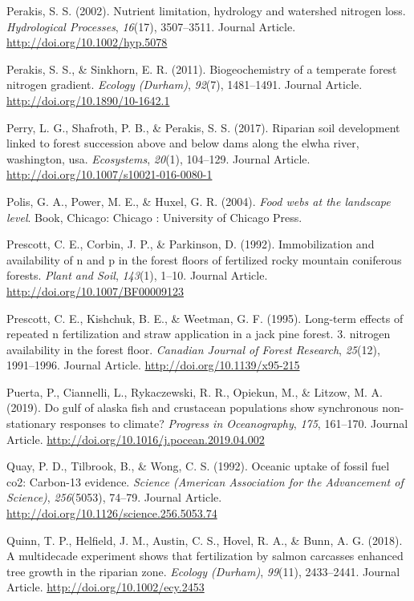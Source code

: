 \documentclass [11pt, proquest] {uwthesis}[2015/03/03]
\begin{document}
\hypertarget{ref-Perakis2002}{}
Perakis, S. S. (2002). Nutrient limitation, hydrology and watershed
nitrogen loss. \emph{Hydrological Processes}, \emph{16}(17), 3507--3511.
Journal Article. \url{http://doi.org/10.1002/hyp.5078}

\hypertarget{ref-Perakis2011}{}
Perakis, S. S., \& Sinkhorn, E. R. (2011). Biogeochemistry of a
temperate forest nitrogen gradient. \emph{Ecology (Durham)},
\emph{92}(7), 1481--1491. Journal Article.
\url{http://doi.org/10.1890/10-1642.1}

\hypertarget{ref-Perry2017}{}
Perry, L. G., Shafroth, P. B., \& Perakis, S. S. (2017). Riparian soil
development linked to forest succession above and below dams along the
elwha river, washington, usa. \emph{Ecosystems}, \emph{20}(1), 104--129.
Journal Article. \url{http://doi.org/10.1007/s10021-016-0080-1}

\hypertarget{ref-Polis2004}{}
Polis, G. A., Power, M. E., \& Huxel, G. R. (2004). \emph{Food webs at
the landscape level}. Book, Chicago: Chicago : University of Chicago
Press.

\hypertarget{ref-Prescott1992}{}
Prescott, C. E., Corbin, J. P., \& Parkinson, D. (1992). Immobilization
and availability of n and p in the forest floors of fertilized rocky
mountain coniferous forests. \emph{Plant and Soil}, \emph{143}(1),
1--10. Journal Article. \url{http://doi.org/10.1007/BF00009123}

\hypertarget{ref-Prescott1995}{}
Prescott, C. E., Kishchuk, B. E., \& Weetman, G. F. (1995). Long-term
effects of repeated n fertilization and straw application in a jack pine
forest. 3. nitrogen availability in the forest floor. \emph{Canadian
Journal of Forest Research}, \emph{25}(12), 1991--1996. Journal Article.
\url{http://doi.org/10.1139/x95-215}

\hypertarget{ref-Puerta2019}{}
Puerta, P., Ciannelli, L., Rykaczewski, R. R., Opiekun, M., \& Litzow,
M. A. (2019). Do gulf of alaska fish and crustacean populations show
synchronous non-stationary responses to climate? \emph{Progress in
Oceanography}, \emph{175}, 161--170. Journal Article.
\url{http://doi.org/10.1016/j.pocean.2019.04.002}

\hypertarget{ref-Quay1992}{}
Quay, P. D., Tilbrook, B., \& Wong, C. S. (1992). Oceanic uptake of
fossil fuel co2: Carbon-13 evidence. \emph{Science (American Association
for the Advancement of Science)}, \emph{256}(5053), 74--79. Journal
Article. \url{http://doi.org/10.1126/science.256.5053.74}

\hypertarget{ref-Quinn2018}{}
Quinn, T. P., Helfield, J. M., Austin, C. S., Hovel, R. A., \& Bunn, A.
G. (2018). A multidecade experiment shows that fertilization by salmon
carcasses enhanced tree growth in the riparian zone. \emph{Ecology
(Durham)}, \emph{99}(11), 2433--2441. Journal Article.
\url{http://doi.org/10.1002/ecy.2453}
\end{document}

